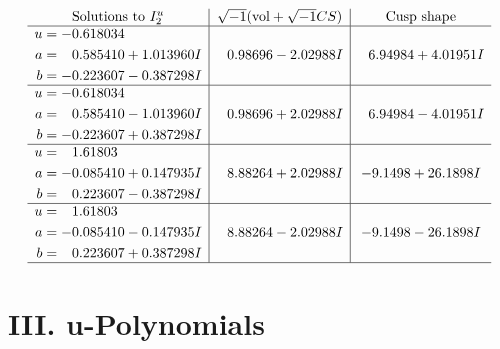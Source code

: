 \documentclass[1p]{elsarticle_modified}
\theoremstyle{definition}
\newcommand{\I}{\sqrt{-1}}
\begin{document}
$$\begin{array}{c|c|c}  
\text{Solutions to }I^u_{2}& \I (\text{vol} + \sqrt{-1}CS) & \text{Cusp shape}\\
 \hline 
\begin{aligned}
u &= -0.618034\phantom{ +0.000000I} \\
a &= \phantom{-}0.585410 + 1.013960 I \\
b &= -0.223607 - 0.387298 I\end{aligned}
 & \phantom{-}0.98696 - 2.02988 I & \phantom{-}6.94984 + 4.01951 I \\ \hline\begin{aligned}
u &= -0.618034\phantom{ +0.000000I} \\
a &= \phantom{-}0.585410 - 1.013960 I \\
b &= -0.223607 + 0.387298 I\end{aligned}
 & \phantom{-}0.98696 + 2.02988 I & \phantom{-}6.94984 - 4.01951 I \\ \hline\begin{aligned}
u &= \phantom{-}1.61803\phantom{ +0.000000I} \\
a &= -0.085410 + 0.147935 I \\
b &= \phantom{-}0.223607 - 0.387298 I\end{aligned}
 & \phantom{-}8.88264 + 2.02988 I & -9.1498 + 26.1898 I \\ \hline\begin{aligned}
u &= \phantom{-}1.61803\phantom{ +0.000000I} \\
a &= -0.085410 - 0.147935 I \\
b &= \phantom{-}0.223607 + 0.387298 I\end{aligned}
 & \phantom{-}8.88264 - 2.02988 I & -9.1498 - 26.1898 I\\
 \hline 
 \end{array}$$\newpage
\newpage\renewcommand{\arraystretch}{1}
\centering \section*{ III. u-Polynomials}
\end{document}
